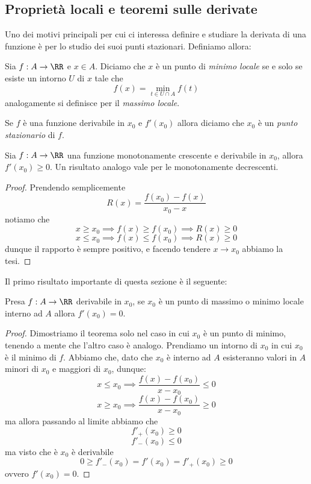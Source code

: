 \documentclass[11pt]{scrartcl}
\begin{document}
	\subsection{Proprietà locali e teoremi sulle derivate}
	Uno dei motivi principali per cui ci interessa definire e studiare la derivata di una funzione è per lo studio dei suoi punti stazionari. Definiamo allora:
	\begin{definition}
		Sia $f:A\to \RR$ e $x\in A$. Diciamo che $x$ è un punto di \textit{minimo locale} se e solo se esiste un intorno $U$ di $x$ tale che 
		$$f(x)=\min_{t\in U\cap A}f(t)$$ 
		analogamente si definisce per il \textit{massimo locale}.
	\end{definition}
	\begin{definition}
		Se $f$ è una funzione derivabile in $x_0$ e $f'(x_0)$ allora diciamo che $x_0$ è un \textit{punto stazionario} di $f$.
	\end{definition}
	\begin{proposition}
		Sia $f:A\to\RR$ una funzione monotonamente crescente e derivabile in $x_0$, allora $f'(x_0)\ge 0$. Un risultato analogo vale per le monotonamente decrescenti.
	\end{proposition}
	\begin{proof}
		Prendendo semplicemente
		$$R(x)=\frac{f(x_0)-f(x)}{x_0-x}$$
		notiamo che 
		$$x\ge x_0 \implies f(x) \ge f(x_0) \implies R(x)\ge 0$$
		$$x\le x_0 \implies f(x) \le f(x_0) \implies R(x)\ge 0$$
		dunque il rapporto è sempre positivo, e facendo tendere $x\to x_0$ abbiamo la tesi.
	\end{proof}
	Il primo risultato importante di questa sezione è il seguente:
	\begin{theorem}[Fermat]
		Presa $f:A\to\RR$ derivabile in $x_0$, se $x_0$ è un punto di massimo o minimo locale interno ad $A$ allora $f'(x_0)=0$.
	\end{theorem}
	\begin{proof}
		Dimostriamo il teorema solo nel caso in cui $x_0$ è un punto di minimo, tenendo a mente che l'altro caso è analogo. Prendiamo un intorno di $x_0$ in cui $x_0$ è il minimo di $f$. Abbiamo che, dato che $x_0$ è interno ad $A$ esisteranno valori in $A$ minori di $x_0$ e maggiori di $x_0$, dunque:
		$$x\le x_0 \implies \frac{f(x)-f(x_0)}{x-x_0}\le 0$$
		$$x\ge x_0 \implies \frac{f(x)-f(x_0)}{x-x_0}\ge 0$$
		ma allora passando al limite abbiamo che 
		$$f'_+(x_0)\ge 0$$
		$$f'_-(x_0)\le 0$$
		ma visto che è $x_0$ è derivabile
		$$0\ge f'_-(x_0)=f'(x_0)=f'_+(x_0)\ge 0$$
		ovvero $f'(x_0)=0$.
	\end{proof}
\end{document}
